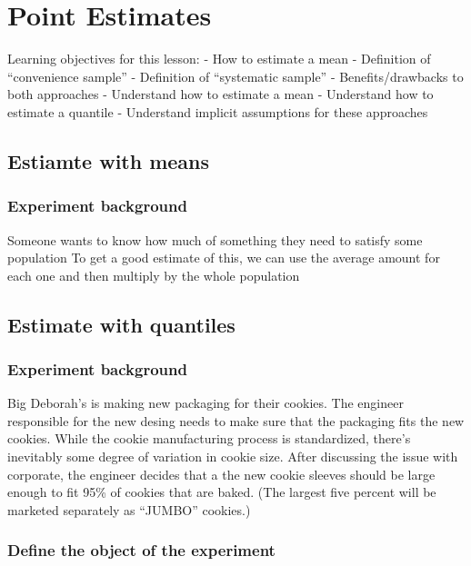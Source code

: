 \documentclass[]{book}
\begin{document}
\chapter{Point Estimates}\label{point-estimates}

Learning objectives for this lesson: - How to estimate a mean -
Definition of ``convenience sample'' - Definition of ``systematic
sample'' - Benefits/drawbacks to both approaches - Understand how to
estimate a mean - Understand how to estimate a quantile - Understand
implicit assumptions for these approaches

\section{Estiamte with means}\label{estiamte-with-means}

\subsection{Experiment background}\label{experiment-background-2}

Someone wants to know how much of something they need to satisfy some
population To get a good estimate of this, we can use the average amount
for each one and then multiply by the whole population

\section{Estimate with quantiles}\label{estimate-with-quantiles}

\subsection{Experiment background}\label{experiment-background-3}

Big Deborah's is making new packaging for their cookies. The engineer
responsible for the new desing needs to make sure that the packaging
fits the new cookies. While the cookie manufacturing process is
standardized, there's inevitably some degree of variation in cookie
size. After discussing the issue with corporate, the engineer decides
that a the new cookie sleeves should be large enough to fit 95\% of
cookies that are baked. (The largest five percent will be marketed
separately as ``JUMBO'' cookies.)

\subsection{Define the object of the
experiment}\label{define-the-object-of-the-experiment}
\end{document}
